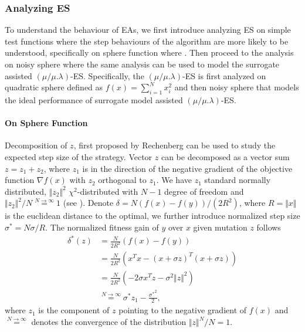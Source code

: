 \subsubsection{Analyzing ES}\label{sssec:analysis_sphere_combined}\hfill

To understand the behaviour of EAs, we first introduce analyzing ES on simple test functions where the step behaviours of the algorithm are more likely to be understood, specifically on sphere function where . Then proceed to the analysis on noisy sphere where the same analysis can be used to model the surrogate assisted $(\mu/\mu.\lambda)$-ES. Specifically, the $(\mu/\mu.\lambda)$-ES is first analyzed on quadratic sphere defined as $f(x) = \sum_{i=1}^N x_i^2$ and then noisy sphere that models the ideal performance of surrogate model assisted $(\mu/\mu.\lambda)$-ES.


\paragraph{On Sphere Function}
Decomposition of $z$, first proposed by Rechenberg \cite{rechenberg1973evolutionsstrategie} can be used to study the expected step size of the strategy. Vector $z$ can be decomposed as a vector sum $z = z_1 + z_2$, where $z_1$ is in the direction of the negative gradient of the objective function $\nabla f(x)$ with $z_2$ orthogonal to $z_1$. We have $z_1$ standard normally distributed, $\Vert z_2\Vert^2$ $\chi^2$-distributed with $N-1$ degree of freedom and $ \Vert z_2\Vert^2 /N \overset{N \rightarrow \infty }{=} 1$ (see \cite{beyer2013theory}). Denote $\delta = N (f(x) - f(y))/(2R^2)$, where $R = \Vert x \Vert$ is the euclidean distance to the optimal, we further introduce normalized step size $\sigma^* = N \sigma/R$. The normalized fitness gain of $y$ over $x$ given mutation $z$ follows
\begin{align}{}
\delta^*(z) & = \frac{N}{2R^2}\left( f(x) - f(y)\right)  \nonumber\\
& = \frac{N}{2R^2} (x^Tx - (x+\sigma z)^T (x+\sigma z)) \nonumber\\
& = \frac{N}{2R^2} (-2 \sigma x^Tz - \sigma^2 \Vert z \Vert^2 ) \nonumber\\
& \overset{N \rightarrow \infty}{=} \sigma^* z_{1} - \frac{{\sigma^*} ^2}{2} \label{eqn:delta_z}{},
\end{align}
where $z_{1}$ is the component of $z$ pointing to the negative gradient of $f(x)$ and $\overset{ N \rightarrow \infty}{=}$ denotes the convergence of the distribution $\Vert z \Vert^N/N = 1$. 


